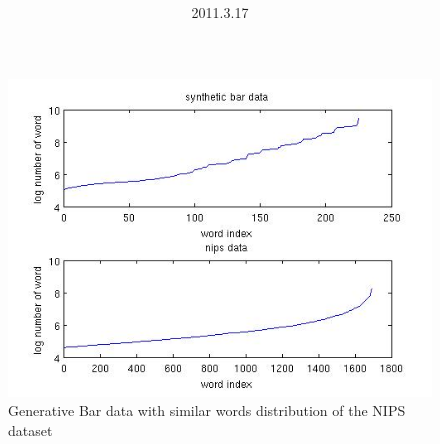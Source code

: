 \documentclass{article}
\title{\vspace{0.3in}\textmd{\textbf{\hmwkTitle}}}
\date{2011.3.17}
\author{\textbf{\hmwkAuthorName}}
\begin{document}
\begin{spacing}{1.1}
\maketitle
\begin{figure}
 \centering
     \includegraphics{data.jpg}
     \caption{Generative Bar data with similar words distribution of the NIPS dataset}
    \label{fig:by:table} 
\end{figure}


\end{spacing}
\end{document}
